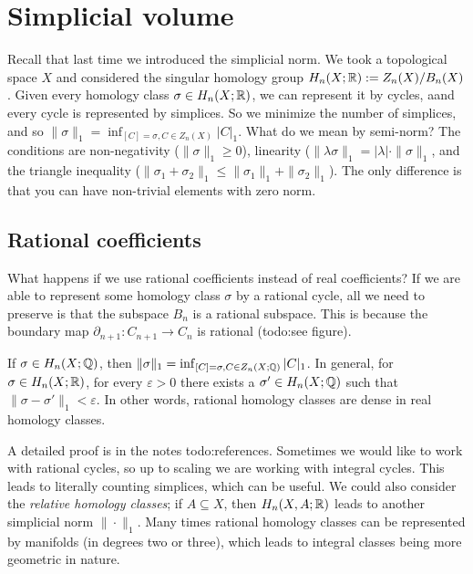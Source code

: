 \section{Simplicial volume} 
Recall that last time we introduced the simplicial norm. We took a topological space $X$ and considered the singular homology group $H_n (X ;\mathbb{R}) := Z_n (X) / B_n (X)$. Given every homology class $\sigma \in H_n (X;\mathbb{R})$, we can represent it by cycles, aand every cycle is represented by simplices. So we minimize the number of simplices, and so $\| \sigma\|_1= \inf _{[C]=\sigma,C \in Z_n (X)}|C|_1$.
What do we mean by semi-norm? The conditions are non-negativity ($\|\sigma\|_1 \geq 0$), linearity ($\| \lambda \sigma\|_1 = |\lambda | \cdot \|\sigma\|_1$, and the triangle inequality ($\|\sigma_1+\sigma_2\|_1 \leq \|\sigma_1\|_1 + \| \sigma_2\|_1$). The only difference is that you can have non-trivial elements with zero norm. 

\subsection{Rational coefficients}
What happens if we use rational coefficients instead of real coefficients? If we are able to represent some homology class $\sigma$ by a rational cycle, all we need to preserve is that the subspace $B_n $ is a rational subspace. This is because the boundary map $\partial _{n+1}\colon C_{n+1} \to C_n $ is rational ({\color{red}todo:see figure}). 

\begin{lemma}
    If $\sigma \in H_n (X; \mathbb{Q})$, then $\| \sigma\|_1= \inf _{[C]=\sigma, C \in Z_n (X;\mathbb{Q})}|C|_1$. In general, for $\sigma \in H_n (X;\mathbb{R})$, for every $\varepsilon >0$ there exists a $\sigma' \in H_n (X;\mathbb{Q})$ such that $\| \sigma- \sigma'\|_1 <\varepsilon $. In other words, rational homology classes are dense in real homology classes.
\end{lemma}
A detailed proof is in the notes {\color{red}todo:references}. Sometimes we would like to work with rational cycles, so up to scaling we are working with integral cycles. This leads to literally counting simplices, which can be useful. We could also consider the \emph{relative homology classes}; if $A \subseteq X$, then $H_n (X, A ;\mathbb{R})$ leads to another simplicial norm $\| \cdot \|_1$. Many times rational homology classes can be represented by manifolds (in degrees two or three), which leads to integral classes being more geometric in nature.

